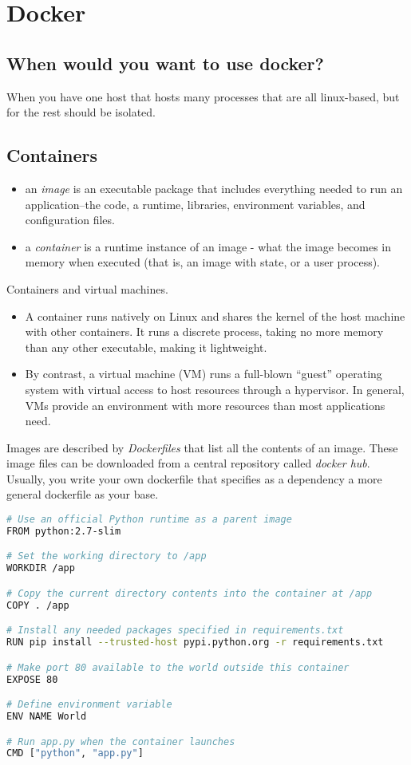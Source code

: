 \section{Docker}

\subsection{When would you want to use docker?}
When you have one host that hosts many processes that are all linux-based, but for the rest should be isolated. 

\subsection{Containers}

\begin{itemize}
    \item an \emph{image} is an executable package that includes everything needed to run an application--the code, a runtime, libraries, environment variables, and configuration files.
    \item a \emph{container} is a runtime instance of an image - what the image becomes in memory when executed (that is, an image with state, or a user process).
\end{itemize}


Containers and virtual machines.
\begin{itemize}
    \item A container runs natively on Linux and shares the kernel of the host machine with other containers. It runs a discrete process, taking no more memory than any other executable, making it lightweight.
    \item By contrast, a virtual machine (VM) runs a full-blown “guest” operating system with virtual access to host resources through a hypervisor. In general, VMs provide an environment with more resources than most applications need.
\end{itemize}

Images are described by \emph{Dockerfiles} that list all the contents of an image. These image files can be downloaded from a central repository called \emph{docker hub}.
Usually, you write your own dockerfile that specifies as a dependency a more general dockerfile as your base. 

\begin{lstlisting}[language=bash]
# Use an official Python runtime as a parent image
FROM python:2.7-slim

# Set the working directory to /app
WORKDIR /app

# Copy the current directory contents into the container at /app
COPY . /app

# Install any needed packages specified in requirements.txt
RUN pip install --trusted-host pypi.python.org -r requirements.txt

# Make port 80 available to the world outside this container
EXPOSE 80

# Define environment variable
ENV NAME World

# Run app.py when the container launches
CMD ["python", "app.py"]
\end{lstlisting}

